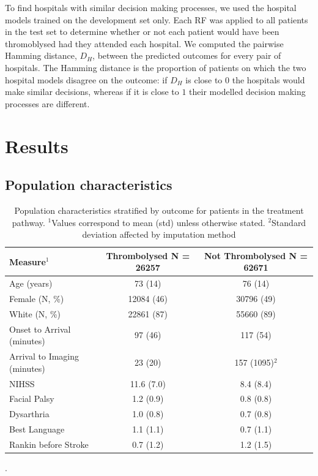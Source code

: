 \documentclass[12pt,a4paper, pdftex]{elsarticle}
\begin{document}
To find hospitals with similar decision making processes, we used the hospital models trained on the development set only. Each RF was applied to all patients in the test set to determine whether or not each patient would have been thromoblysed had they attended each hospital. We computed the pairwise Hamming distance, $D_H$, between the predicted outcomes for every pair of hospitals.  The Hamming distance is the proportion of patients on which the two hospital models disagree on the outcome: if $D_H$ is close to $0$ the hospitals would make similar decisions, whereas if it is close to $1$ their modelled decision making processes are different.

\section{Results}

\subsection{Population characteristics} 
    \begin{table}[h!]
        \centering
        \begin{tabular}{|l|c|c|}
        \hline
        {\bf Measure$^1$} & {\bf Thrombolysed N = 26257} & {\bf Not Thrombolysed N = 62671}  \\
        \hline
        Age (years) & 73 (14) & 76 (14)\\
        Female (N, \%) & 12084 (46) & 30796 (49)\\
        White (N, \%) & 22861 (87) & 55660 (89)\\
        Onset to Arrival (minutes) & 97 (46) & 117 (54) \\
        Arrival to Imaging (minutes) & 23 (20)  & 157 (1095)$^2$\\
        NIHSS & 11.6 (7.0) & 8.4 (8.4)\\
        Facial Palsy & 1.2 (0.9) & 0.8 (0.8)\\
        Dysarthria & 1.0 (0.8) & 0.7 (0.8)\\
        Best Language & 1.1 (1.1) & 0.7 (1.1) \\
        Rankin before Stroke & 0.7 (1.2) & 1.2 (1.5) \\
        \hline
        \end{tabular}
        \caption{Population characteristics stratified by outcome for patients in the treatment pathway. $^1$Values correspond to mean (std) unless otherwise stated. $^2$Standard deviation affected by imputation method}.
        \label{tab:1}
    \end{table}
\end{document}
